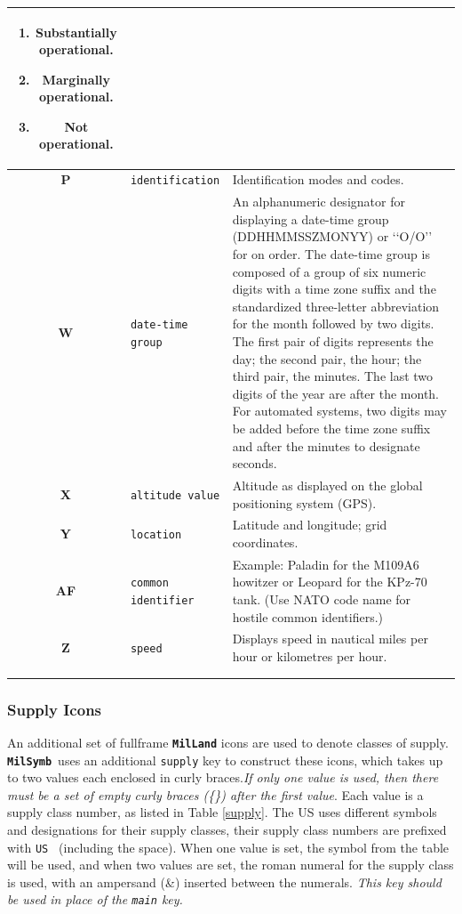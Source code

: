 \documentclass[a4paper, titlepage]{article}
\newcommand\MilSymb{\textbf{\texttt{MilSymb}}}
\begin{document}
\begin{center}
\begin{tabularx}{\textwidth}{|c|l|X|}
\begin{enumerate}[label=\arabic*., align=left]
\item Substantially operational.
\item Marginally operational.
\item Not operational.
\end{enumerate} \\ \hline
\textbf{P} & \texttt{identification} & Identification modes and codes.\\ \hline
\textbf{W} & \texttt{date-time group} & An alphanumeric designator for displaying a date-time group (DDHHMMSSZMONYY) or \lq\lq{}O/O\rq\rq{} for on order. The date-time group is composed of a group of six numeric digits with a time zone suffix and the standardized three-letter abbreviation for the month followed by two digits. The first pair of digits represents the day; the second pair, the hour; the third pair, the minutes. The last two digits of the year are after the month. For automated systems, two digits may be added before the time zone suffix and after the minutes to designate seconds.\\ \hline
\textbf{X} & \texttt{altitude value} & Altitude as displayed on the global positioning system (GPS). \\ \hline
\textbf{Y} & \texttt{location} & Latitude and longitude; grid coordinates. \\ \hline
\textbf{AF} & \texttt{common identifier} & Example: Paladin for the M109A6 howitzer or Leopard for the KPz-70 tank. (Use NATO code name for hostile common identifiers.) \\ \hline
\textbf{Z} & \texttt{speed} & Displays speed in nautical miles per hour or kilometres per hour. \\ \hline
\multicolumn{3}{c}{}\\
\caption{Description of \textbf{\texttt{MilLand}} text field amplifiers.}
\label{landtexttable}
\end{tabularx}
\end{center}

\subsubsection{Supply Icons}

An additional set of fullframe \textbf{\texttt{MilLand}} icons are used to denote classes of supply. \MilSymb\ uses an additional \texttt{supply} key to construct these icons, which takes up to two values each enclosed in curly braces.\textit{If only one value is used, then there must be a set of empty curly braces (\{\}) after the first value}. Each value is a supply class number, as listed in Table \ref{supply}. The US uses different symbols and designations for their supply classes, their supply class numbers are prefixed with \texttt{US } (including the space). When one value is set, the symbol from the table will be used, and when two values are set, the roman numeral for the supply class is used, with an ampersand (\&) inserted between the numerals. \textit{This key should be used in place of the \texttt{main} key.}
\end{document}
